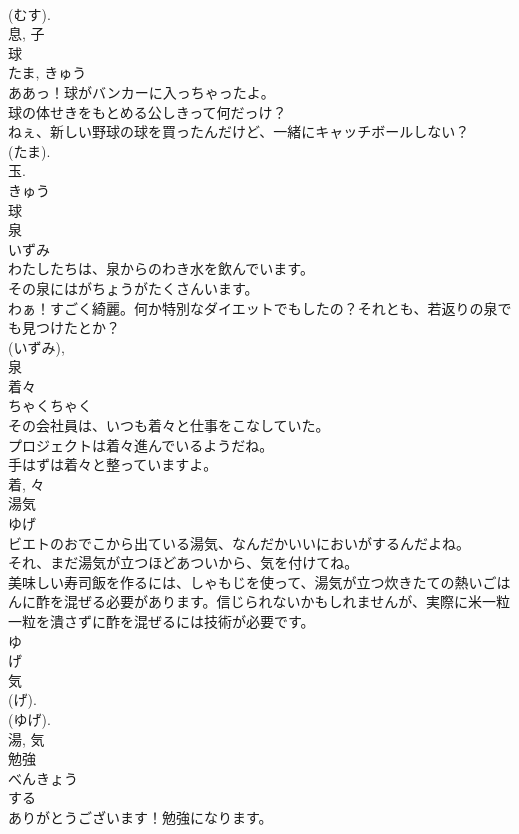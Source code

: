 \documentclass[8pt]{extreport}
\begin{document}
\begin{CJK}{UTF8}{min}
\\	(むす). 
\\	息, 子	
\\	球	
\\	たま, きゅう	
\\	ああっ！球がバンカーに入っちゃったよ。	
\\	球の体せきをもとめる公しきって何だっけ？	
\\	ねぇ、新しい野球の球を買ったんだけど、一緒にキャッチボールしない？	
\\	(たま). 
\\	玉. 
\\	きゅう 
\\	球	
\\	泉	
\\	いずみ	
\\	わたしたちは、泉からのわき水を飲んでいます。	
\\	その泉にはがちょうがたくさんいます。	
\\	わぁ！すごく綺麗。何か特別なダイエットでもしたの？それとも、若返りの泉でも見つけたとか？	
\\	(いずみ), 
\\	泉	
\\	着々	
\\	ちゃくちゃく	
\\	その会社員は、いつも着々と仕事をこなしていた。	
\\	プロジェクトは着々進んでいるようだね。	
\\	手はずは着々と整っていますよ。	
\\	着, 々	
\\	湯気	
\\	ゆげ	
\\	ビエトのおでこから出ている湯気、なんだかいいにおいがするんだよね。	
\\	それ、まだ湯気が立つほどあついから、気を付けてね。	
\\	美味しい寿司飯を作るには、しゃもじを使って、湯気が立つ炊きたての熱いごはんに酢を混ぜる必要があります。信じられないかもしれませんが、実際に米一粒一粒を潰さずに酢を混ぜるには技術が必要です。	
\\	ゆ 
\\	げ 
\\	気 
\\	(げ). 
\\	(ゆげ). 
\\	湯, 気	
\\	勉強	
\\	べんきょう	
\\	する 
\\	ありがとうございます！勉強になります。	

\end{CJK}
\end{document}
